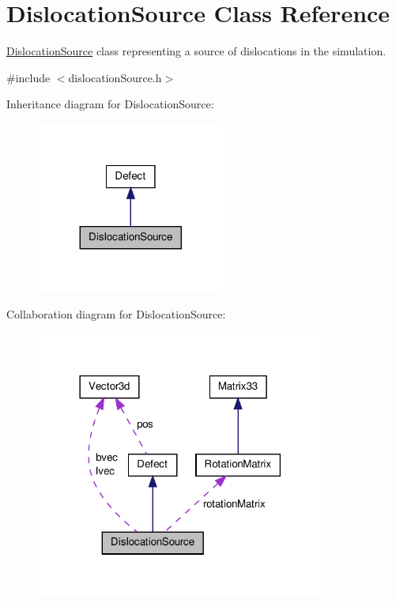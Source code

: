 \hypertarget{classDislocationSource}{\section{\-Dislocation\-Source \-Class \-Reference}
\label{de/de3/classDislocationSource}
}


\hyperlink{classDislocationSource}{\-Dislocation\-Source} class representing a source of dislocations in the simulation.  




{\ttfamily \#include $<$dislocation\-Source.\-h$>$}



\-Inheritance diagram for \-Dislocation\-Source\-:\nopagebreak
\begin{figure}[H]
\begin{center}
\leavevmode
\includegraphics[width=176pt]{dc/d96/classDislocationSource__inherit__graph}
\end{center}
\end{figure}


\-Collaboration diagram for \-Dislocation\-Source\-:\nopagebreak
\begin{figure}[H]
\begin{center}
\leavevmode
\includegraphics[width=270pt]{da/d4c/classDislocationSource__coll__graph}
\end{center}
\end{figure}
